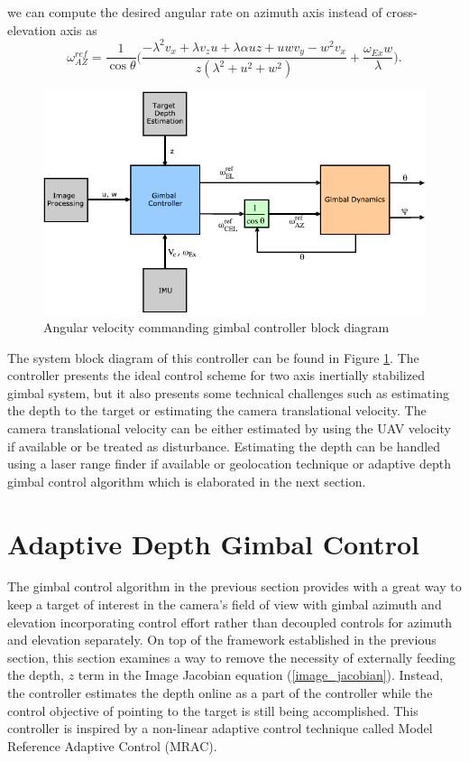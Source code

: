 we can compute the desired angular rate on azimuth axis instead of cross-elevation axis as
\begin{equation}
\omega_{AZ}^{ref}=\frac{1}{\cos \theta}\bigg(\frac{-\lambda^2 v_x+\lambda v_z u+\lambda \alpha uz +uwv_y -w^2 v_x}{z(\lambda^2+u^2+w^2)}+\frac{\omega_{Ex}w}{\lambda}\bigg).
\end{equation}
\begin{figure}[htbp]
	\centering
	\includegraphics[width = 5in]{images/chapter2/gp_blockdiagram.pdf}
	\caption{Angular velocity commanding gimbal controller block diagram}
	\label{avcg_blockdiagram}
\end{figure}
The system block diagram of this controller can be found in Figure \ref{avcg_blockdiagram}. The controller presents the ideal control scheme for two axis inertially stabilized gimbal system, but it also presents some technical challenges such as estimating the depth to the target or estimating the camera translational velocity. The camera translational velocity can be either estimated by using the UAV velocity if available or be treated as disturbance. Estimating the depth can be handled using a laser range finder if available or geolocation technique or adaptive depth gimbal control algorithm which is elaborated in the next section.

\section{Adaptive Depth Gimbal Control}
The gimbal control algorithm in the previous section provides with a great way to keep a target of interest in the camera's field of view with gimbal azimuth and elevation incorporating control effort rather than decoupled controls for azimuth and elevation separately. On top of the framework established in the previous section, this section examines a way to remove the necessity of externally feeding the depth, $z$ term in the Image Jacobian equation (\ref{image_jacobian}). Instead, the controller estimates the depth online as a part of the controller while the control objective of pointing to the target is still being accomplished. This controller is inspired by a non-linear adaptive control technique called Model Reference Adaptive Control (MRAC).
